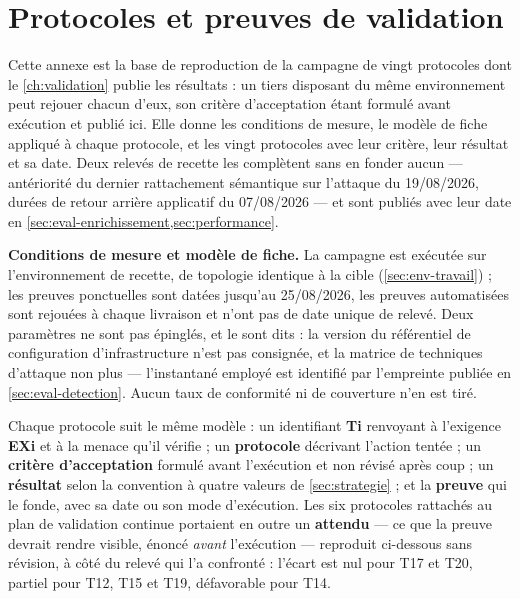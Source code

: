 \chapter{Protocoles et preuves de validation}
\label{ann:protocoles-tests}

Cette annexe est la base de reproduction de la campagne de vingt protocoles dont le
\cref{ch:validation} publie les résultats : un tiers disposant du même environnement peut
rejouer chacun d'eux, son critère d'acceptation étant formulé avant exécution et publié ici. Elle
donne les conditions de mesure, le modèle de fiche appliqué à chaque protocole, et les vingt
protocoles avec leur critère, leur résultat et sa date. Deux relevés de recette les complètent sans
en fonder aucun --- antériorité du dernier rattachement sémantique sur l'attaque du 19/08/2026,
durées de retour arrière applicatif du 07/08/2026 --- et sont publiés avec leur date en
\cref{sec:eval-enrichissement,sec:performance}.

\medskip
\noindent\textbf{Conditions de mesure et modèle de fiche.} La campagne est exécutée sur l'environnement de recette, de topologie identique à la cible
(\cref{sec:env-travail}) ; les preuves ponctuelles sont datées jusqu'au 25/08/2026, les preuves
automatisées sont rejouées à chaque livraison et n'ont pas de date unique de relevé. Deux
paramètres ne sont pas épinglés, et le sont dits : la version du référentiel de configuration
d'infrastructure n'est pas consignée, et la matrice de techniques d'attaque non plus ---
l'instantané employé est identifié par l'empreinte publiée en \cref{sec:eval-detection}. Aucun taux
de conformité ni de couverture n'en est tiré.

Chaque protocole suit le même modèle : un identifiant \textbf{Ti} renvoyant à l'exigence
\textbf{EXi} et à la menace qu'il vérifie ; un \textbf{protocole} décrivant l'action tentée ; un
\textbf{critère d'acceptation} formulé avant l'exécution et non révisé après coup ; un
\textbf{résultat} selon la convention à quatre valeurs de \cref{sec:strategie} ; et la
\textbf{preuve} qui le fonde, avec sa date ou son mode d'exécution. Les six protocoles rattachés au
plan de validation continue portaient en outre un \textbf{attendu} --- ce que la preuve devrait
rendre visible, énoncé \emph{avant} l'exécution --- reproduit ci-dessous sans révision, à côté du
relevé qui l'a confronté : l'écart est nul pour T17 et T20, partiel pour T12, T15 et T19,
défavorable pour T14.

